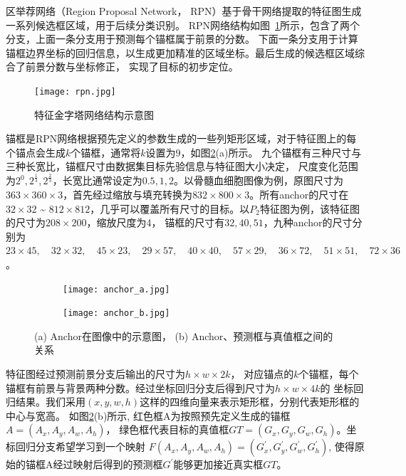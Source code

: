 区举荐网络（Region Proposal Network， RPN）基于骨干网络提取的特征图生成一系列候选框区域，用于后续分类识别。
RPN网络结构如图~\ref{fig:rpn}所示，包含了两个分支，上面一条分支用于预测每个锚框属于前景的分数。
下面一条分支用于计算锚框边界坐标的回归信息，以生成更加精准的区域坐标。最后生成的候选框区域综合了前景分数与坐标修正，
实现了目标的初步定位。

\begin{figure}               
  \centering                
  \texttt{[image: rpn.jpg]}                
  \caption{特征金字塔网络结构示意图}                
  \label{fig:rpn}     
\end{figure}   

锚框是RPN网络根据预先定义的参数生成的一些列矩形区域，对于特征图上的每个锚点会生成$k$个锚框，通常将$k$设置为$9$，如图\ref{fig:anchor}(a)所示。
九个锚框有三种尺寸与三种长宽比，锚框尺寸由数据集目标先验信息与特征图大小决定，
尺度变化范围为$2^0, 2^{\frac{1}{3}},  2^{\frac{2}{3}}$，长宽比通常设定为$0.5, 1, 2$。以骨髓血细胞图像为例，原图尺寸为
$363 \times 360 \times 3$，首先经过缩放与填充转换为$832 \times 800 \times 3$。所有anchor的尺寸在$32 \times 32$ \textasciitilde
$812 \times 812$，几乎可以覆盖所有尺寸的目标。以$P_2$特征图为例，该特征图的尺寸为$208 \times 200$，缩放尺度为4，
锚框的尺寸有$32, 40, 51$，九种anchor的尺寸分别为
$23 \times 45,\quad32 \times 32,\quad45 \times 23,\quad29 \times 57,\quad40 \times 40,\quad57 \times 29,\quad36 \times 72,\quad51 \times 51,\quad72 \times 36$。

\begin{figure}[htbp]
	\centering
	\begin{subfigure}{0.45\linewidth}
		\centering
		\texttt{[image: anchor\_a.jpg]}
    \caption{}
	\end{subfigure}
	\centering
	\begin{subfigure}{0.45\linewidth}
		\centering
		\texttt{[image: anchor\_b.jpg]}
    \caption{}
	\end{subfigure}
	\caption{(a) Anchor在图像中的示意图， (b) Anchor、预测框与真值框之间的关系}
	\label{fig:anchor}
\end{figure}

特征图经过预测前景分支后输出的尺寸为$h\times w \times 2k$，
对应锚点的$k$个锚框，每个锚框有前景与背景两种分数。经过坐标回归分支后得到尺寸为$h\times w \times 4k$的
坐标回归结果。我们采用$(x, y, w, h)$这样的四维向量来表示矩形框，分别代表矩形框的中心与宽高。
如图\ref{fig:anchor}(b)所示, 红色框A为按照预先定义生成的锚框$A = \left( {{A_x},{A_y},{A_w},{A_h}} \right)$，
绿色框代表目标的真值框$GT = \left( {{G_x},{G_y},{G_w},{G_h}} \right)$。坐标回归分支希望学习到一个映射
$F\left(A_{x}, A_{y}, A_{w}, A_{h}\right)=\left(G_{x}^{\prime}, G_{y}^{\prime}, G_{w}^{\prime}, G_{h}^{\prime}\right)$,
使得原始的锚框A经过映射后得到的预测框$G^{\prime}$能够更加接近真实框$GT$。

